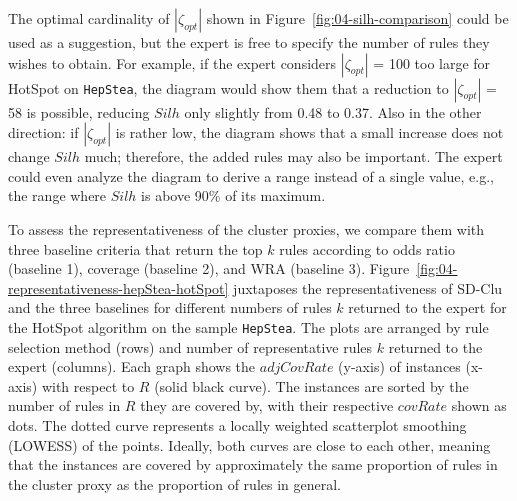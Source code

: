 \documentclass[
  oneside]{book}
\begin{document}
The optimal cardinality of \(|\zeta_{opt}|\) shown in Figure~\ref{fig:04-silh-comparison} could be used as a suggestion, but the expert is free to specify the number of rules they wishes to obtain.
For example, if the expert considers \(|\zeta_{opt}|\) = 100 too large for HotSpot on \texttt{HepStea}, the diagram would show them that a reduction to \(|\zeta_{opt}|\) = 58 is possible, reducing \(Silh\) only slightly from 0.48 to 0.37.
Also in the other direction: if \(|\zeta_{opt}|\) is rather low, the diagram shows that a small increase does not change \(Silh\) much; therefore, the added rules may also be important.
The expert could even analyze the diagram to derive a range instead of a single value, e.g., the range where \(Silh\) is above 90\% of its maximum.

To assess the representativeness of the cluster proxies, we compare them with three baseline criteria that return the top \(k\) rules according to odds ratio (baseline 1), coverage (baseline 2), and WRA (baseline 3).
Figure~\ref{fig:04-representativeness-hepStea-hotSpot} juxtaposes the representativeness of SD-Clu and the three baselines for different numbers of rules \(k\) returned to the expert for the HotSpot algorithm on the sample \texttt{HepStea}.
The plots are arranged by rule selection method (rows) and number of representative rules \(k\) returned to the expert (columns).
Each graph shows the \(adjCovRate\) (y-axis) of instances (x-axis) with respect to \(R\) (solid black curve).
The instances are sorted by the number of rules in \(R\) they are covered by, with their respective \(covRate\) shown as dots.
The dotted curve represents a locally weighted scatterplot smoothing (LOWESS) of the points.
Ideally, both curves are close to each other, meaning that the instances are covered by approximately the same proportion of rules in the cluster proxy as the proportion of rules in general.
\end{document}
